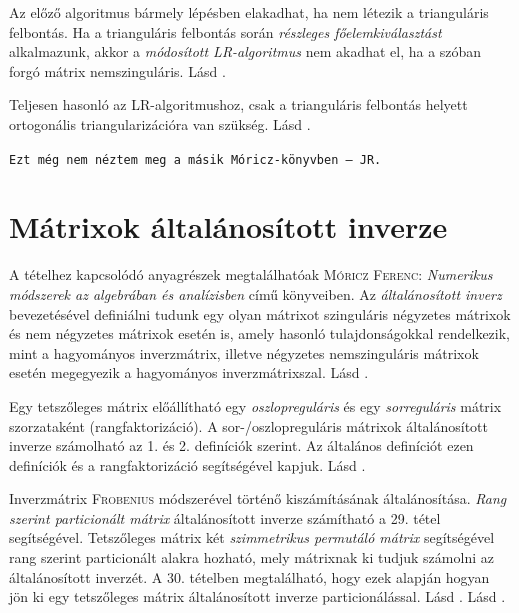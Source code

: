 \documentclass[%
	DIV=15,appendixprefix]{scrreprt}
\theoremstyle{definition}
\theoremstyle{remark}
\begin{document}
Az előző algoritmus bármely lépésben elakadhat, ha nem létezik a trianguláris felbontás. Ha a
trianguláris felbontás során \emph{részleges főelemkiválasztást} alkalmazunk, akkor a
\emph{módosított LR-algoritmus} nem akadhat el, ha a szóban forgó mátrix nemszinguláris.
%
Lásd \cite[I. fejezet, 4. szakasz]{Moricz1997}.

Teljesen hasonló az LR-algoritmushoz, csak a trianguláris felbontás helyett ortogonális
triangularizációra van szükség.
%
Lásd \cite[II. fejezet, 5. szakasz]{Moricz2008}.

\texttt{Ezt még nem néztem meg a másik Móricz-könyvben -- JR.}
%
\section{Mátrixok általánosított inverze}
A tételhez kapcsolódó anyagrészek megtalálhatóak \textsc{Móricz Ferenc}: \emph{Numerikus módszerek
az algebrában és analízisben} \cite[II. fejezet]{Moricz1997} című könyveiben.
%
Az \emph{általánosított inverz} bevezetésével definiálni tudunk egy olyan mátrixot szinguláris
négyzetes mátrixok és nem négyzetes mátrixok esetén is, amely hasonló tulajdonságokkal rendelkezik,
mint a hagyományos inverzmátrix, illetve négyzetes nemszinguláris mátrixok esetén megegyezik a
hagyományos inverzmátrixszal.
%
Lásd \cite[II. fejezet, 6. szakasz]{Moricz1997}.

Egy tetszőleges mátrix előállítható egy \emph{oszlopreguláris} és egy \emph{sorreguláris} mátrix
szorzataként (rangfaktorizáció). A sor-/oszlopreguláris mátrixok általánosított inverze számolható
az 1. és 2. definíciók szerint. Az általános definíciót ezen definíciók és a rangfaktorizáció
segítségével kapjuk.
%
Lásd \cite[II. fejezet, 8. szakasz]{Moricz1997}.

Inverzmátrix \textsc{Frobenius} módszerével történő kiszámításának általánosítása. \emph{Rang
szerint particionált mátrix} általánosított inverze  számítható a 29. tétel
segítségével. Tetszőleges mátrix két \emph{szimmetrikus permutáló mátrix} segítségével rang szerint
particionált alakra hozható, mely mátrixnak ki tudjuk számolni az általánosított inverzét. A 30.
tételben megtalálható, hogy ezek alapján hogyan jön ki egy tetszőleges mátrix általánosított inverze
particionálással.
%
Lásd \cite[II. fejezet, 8. szakasz utolsó megjegyzése]{Moricz1997}.
%
Lásd \cite[II. fejezet, 7. szakasz]{Moricz1997}.
\end{document}
